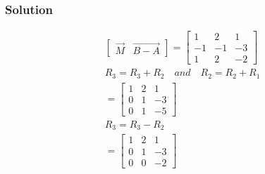 \documentclass{beamer}
\begin{document}
\begin{frame}
\frametitle{Solution}
\begin{align}
   \begin{bmatrix}\vec{M} & \vec{B-A}\end{bmatrix} = \begin{bmatrix}1 & 2 & 1 \\ -1 & -1 & -3\\1 & 2 & -2\end{bmatrix}\\
 R_3 = R_3 + R_2 \quad and \quad  R_2 = R_2 + R_1\\
 = \begin{bmatrix}1 & 2 & 1 \\ 0 & 1 & -3\\0 & 1 & -5\end{bmatrix}\\
    R_3 = R_3  - R_2 \\
 = \begin{bmatrix}1 & 2 & 1 \\ 0 & 1 & -3\\0 & 0 & -2\end{bmatrix}
\end{align}
\end{frame}
\end{document}
